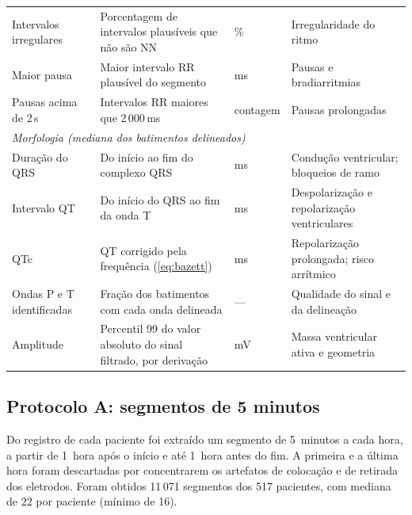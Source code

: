 \begin{table}[h!]
{\begin{tabular}{p{3.0cm}p{5.2cm}p{1.0cm}p{4.9cm}}
			Intervalos irregulares & Porcentagem de intervalos plausíveis que não são NN & \% & Irregularidade do ritmo \\
			Maior pausa & Maior intervalo RR plausível do segmento & ms & Pausas e bradiarritmias \\
			Pausas acima de 2\,s & Intervalos RR maiores que 2\,000\,ms & contagem & Pausas prolongadas \\
			\midrule
			\multicolumn{4}{l}{\textit{Morfologia (mediana dos batimentos delineados)}} \\
			Duração do QRS & Do início ao fim do complexo QRS & ms & Condução ventricular; bloqueios de ramo \\
			Intervalo \gls{QT} & Do início do QRS ao fim da onda T & ms & Despolarização e repolarização ventriculares \\
			\gls{QTc} & QT corrigido pela frequência (\autoref{eq:bazett}) & ms & Repolarização prolongada; risco arrítmico \\
			Ondas P e T identificadas & Fração dos batimentos com cada onda delineada & --- & Qualidade do sinal e da delineação \\
			Amplitude & Percentil 99 do valor absoluto do sinal filtrado, por derivação & mV & Massa ventricular ativa e geometria \\
			\bottomrule
		\end{tabular}
	}{
	}
\end{table}

\subsection{Protocolo A: segmentos de 5 minutos}
\label{subsec:met-protocolo-a}

Do registro de cada paciente foi extraído um segmento de 5~minutos a cada
hora, a partir de 1~hora após o início e até 1~hora antes do fim. A primeira
e a última hora foram descartadas por concentrarem os artefatos de colocação
e de retirada dos eletrodos. Foram obtidos 11\,071 segmentos dos 517
pacientes, com mediana de 22 por paciente (mínimo de 16).

